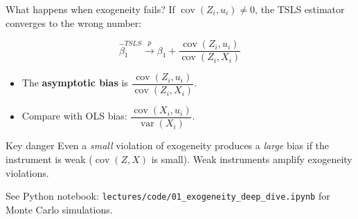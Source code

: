 \documentclass[10pt]{beamer}
\begin{document}
\begin{frame}{What happens when exogeneity fails?}
\label{slide:exogeneity_fails}
If $\operatorname{cov}(Z_i, u_i) \neq 0$, the TSLS estimator converges to the \alert{wrong number}:

\[
\widehat{\beta}_1^{TSLS} \xrightarrow{p} \beta_1 + \frac{\operatorname{cov}(Z_i, u_i)}{\operatorname{cov}(Z_i, X_i)}
\]

\pause
\begin{itemize}
  \item The \textbf{asymptotic bias} is $\dfrac{\operatorname{cov}(Z_i, u_i)}{\operatorname{cov}(Z_i, X_i)}$.
  \item Compare with OLS bias: $\dfrac{\operatorname{cov}(X_i, u_i)}{\operatorname{var}(X_i)}$.
\end{itemize}

\pause
\begin{alertblock}{Key danger}
Even a \emph{small} violation of exogeneity produces a \emph{large} bias if the instrument is weak ($\operatorname{cov}(Z,X)$ is small). Weak instruments \alert{amplify} exogeneity violations.
\end{alertblock}

\vspace{0.3em}
{\footnotesize\color{gray} See Python notebook: \texttt{lectures/code/01\_exogeneity\_deep\_dive.ipynb} for Monte Carlo simulations.}
\end{frame}
\end{document}
